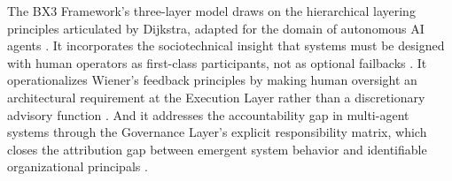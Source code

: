 The BX3 Framework's three-layer model draws on the hierarchical layering principles articulated by Dijkstra, adapted for the domain of autonomous AI agents \cite{dijkstra1982}. It incorporates the sociotechnical insight that systems must be designed with human operators as first-class participants, not as optional failbacks \cite{tristr81}. It operationalizes Wiener's feedback principles by making human oversight an architectural requirement at the Execution Layer rather than a discretionary advisory function \cite{wiener1948}. And it addresses the accountability gap in multi-agent systems through the Governance Layer's explicit responsibility matrix, which closes the attribution gap between emergent system behavior and identifiable organizational principals \cite{bansal2019}.